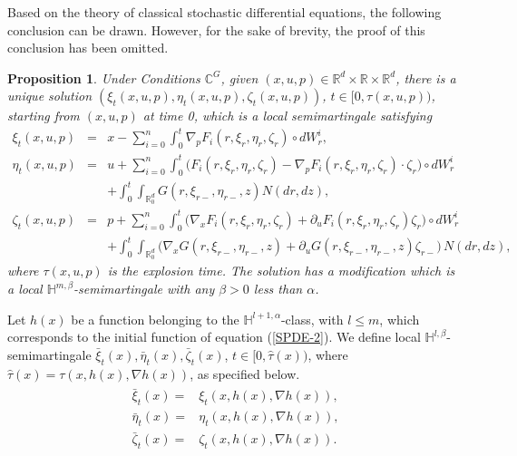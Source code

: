 \documentclass[12pt,oneside, reqno]{amsart}
\newcommand{\be}{\begin{eqnarray}}
\newcommand{\ee}{\end{eqnarray}}
\newcommand{\ce}{\begin{eqnarray*}}
\newcommand{\de}{\end{eqnarray*}}
\newtheorem{proposition}[theorem]{Proposition}
\def\mC{{\mathbb C}}
\def\mH{{\mathbb H}}
\def\mR{{\mathbb R}}
\def\leq{\leqslant}
\numberwithin{equation}{section}
\begin{document}
	
	

	
	Based on the theory of classical stochastic differential equations, the following conclusion can be drawn. However, for the sake of brevity, the proof of this conclusion has been omitted.
	\begin{proposition}
 Under Conditions $\mC^G$,	given $(x,u,p)\in \mR^d\times \mR\times \mR^d$,   there is a unique solution  $(\xi_t(x,u,p),\eta_t(x,u,p),\zeta_t(x,u,p))$, $t\in[0,\tau(x,u,p))$, starting from $(x,u,p)$ at time 0, which  is a local  semimartingale satisfying 
		\ce 
    \xi_t(x,u,p)&=&x-\sum_{i=0}^{n}\int_0^t\nabla_p F_i(r,\xi_r,\eta_r,\zeta_r)\circ dW_r^i,\\
	\eta_t(x,u,p)&=&u+\sum_{i=0}^{n} \int_0^t\bigg( F_i(r,\xi_r,\eta_r,\zeta_r)- \nabla_pF_i(r,\xi_r,\eta_r,\zeta_r)\cdot\zeta_r \bigg)\circ dW_r^i\\
	&&+\int_0^t\int_{\mR^d_0}G(r,\xi_{r-},\eta_{r-},z) N(dr,dz),\\
    \zeta_t(x,u,p)&=&p+\sum_{i=0}^{n} \int_0^t\bigg(\nabla_xF_i(r,\xi_r,\eta_r,\zeta_r)+ \partial_uF_i(r,\xi_r,\eta_r,\zeta_r)\zeta_r \bigg)\circ dW_r^i\\
	&&+\int_0^t\int_{\mR^d_0}\bigg(\nabla_xG(r,\xi_{r-},\eta_{r-},z)+\partial_uG(r,\xi_{r-},\eta_{r-},z)\zeta_{r-}\bigg)\, N(dr,dz),
	\de 
where $\tau(x,u,p)$ is the explosion time. The solution has a modification which is a local $\mH^{m,\beta}$-semimartingale with any $\beta>0$ less than $\alpha$.
\end{proposition}

	Let $h(x)$ be a function belonging to the $\mH^{l+1,\alpha}$-class, with $l\leq m$, which corresponds to the initial function of equation (\ref{SPDE-2}). We define local $\mH^{l,\beta}$-semimartingale $\bar{\xi}_t(x), \bar{\eta}_t(x), \bar{\zeta}_t(x)$, $t\in [0,\hat{\tau}(x))$, where $\hat{\tau}(x)=\tau(x,h(x),\nabla h(x))$, as specified below.
	\be\label{XEZexpross2}
	\begin{split}
	\bar{\xi}_t(x)=&\xi_t(x,h(x),\nabla h(x)),\label{char-equ-1} \\
	\bar{\eta}_t(x)=&\eta_t(x,h(x),\nabla h(x)),\label{char-equ-2} \\
	\bar{\zeta}_t(x)=&\zeta_t(x,h(x),\nabla h(x)).\label{char-equ-3} 
	\end{split}
	\ee
\end{document}

